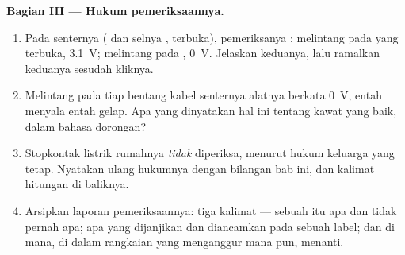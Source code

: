 \begin{problem}
\medskip\noindent\textbf{Bagian III --- Hukum pemeriksaannya.}
\begin{enumerate}[resume]
  \item Pada senternya ( dan selnya , 
        terbuka), pemeriksanya : melintang pada  yang
        terbuka, \qty{3.1}{V}; melintang pada , \qty{0}{V}.
        Jelaskan keduanya, lalu ramalkan keduanya sesudah 
        kliknya.
  \item Melintang pada tiap bentang kabel senternya alatnya berkata
        \qty{0}{V}, entah menyala entah gelap. Apa yang dinyatakan
        hal ini tentang kawat yang baik, dalam bahasa dorongan?
  \item Stopkontak listrik rumahnya \emph{tidak} diperiksa, menurut
        hukum keluarga yang tetap. Nyatakan ulang hukumnya dengan
        bilangan bab ini, dan kalimat hitungan di baliknya.
  \item Arsipkan laporan pemeriksaannya: tiga kalimat --- sebuah
         itu apa dan tidak pernah apa; apa yang dijanjikan
        dan diancamkan  pada sebuah label; dan di
        mana, di dalam rangkaian yang menganggur mana pun, 
        menanti.
\end{enumerate}
\end{problem}

